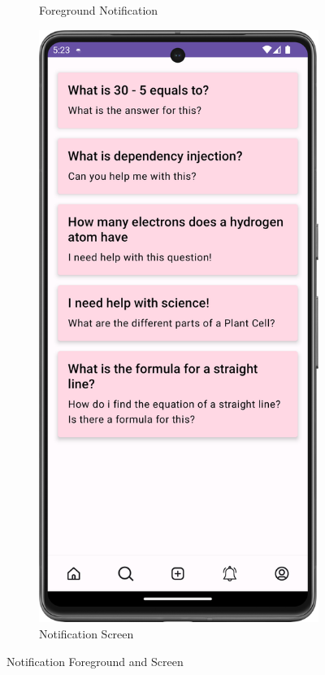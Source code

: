 \begin{figure}[H]
\begin{subfigure}[b]{0.5\textwidth}
    \caption{Foreground Notification}
    \label{fig:foreground_notification}
  \end{subfigure}
  \hfill
  \begin{subfigure}[b]{0.5\textwidth}
    \includegraphics[width=\textwidth]{Figures/Product_Images/Notification/notification_screen.png}
    \caption{Notification Screen}
    \label{fig:notification_screen}
  \end{subfigure}
  \caption{Notification Foreground and Screen}
\end{figure}




